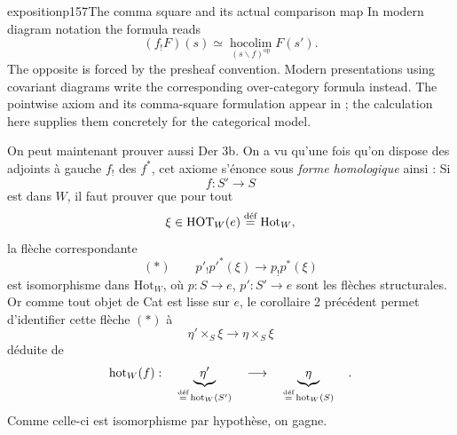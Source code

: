 \begin{dcomment}{exposition}{p157}{The comma square and its actual comparison map}
In modern diagram notation the formula reads
\[
 (f_!F)(s)\simeq
 \operatorname*{hocolim}_{(s\backslash f)^{\mathrm{op}}}F(s').
\]
The opposite is forced by the presheaf convention. Modern presentations using covariant diagrams write the corresponding over-category formula instead. The pointwise axiom and its comma-square formulation appear in \citet[Definition~1.5 and Proposition~1.26]{Groth2013}; the calculation here supplies them concretely for the categorical model.
\end{dcomment}


On peut maintenant prouver aussi Der 3b. On a vu qu'une fois qu'on dispose des adjoints à gauche $f_!$ des $f^*$, cet axiome s'énonce sous \textit{forme homologique} ainsi : Si
\[f : S'\longrightarrow S\]
est dans $W$, il faut prouver que pour tout
\[\xi\in\mathrm{HOT}_W(e)\overset{\text{déf}}{=}\mathrm{Hot}_W,\]
la flèche correspondante
\[(*)\qquad p'_!p'^*(\xi)\longrightarrow p_!p^*(\xi)\]
est isomorphisme dans $\mathrm{Hot}_W$, où $p : S\longrightarrow e$, $p' : S'\longrightarrow e$ sont les flèches structurales. Or comme tout objet de Cat est lisse sur $e$, le corollaire 2 précédent permet d'identifier cette flèche $(*)$ à
\[\eta'\times_S\xi\longrightarrow\eta\times_S\xi\]
déduite de
\[\hot_W(f) :\quad\underbrace{\ \eta'\ }_{\overset{\text{déf}}{=}\,\hot_W(S')}\quad\longrightarrow\quad\underbrace{\ \eta\ }_{\overset{\text{déf}}{=}\,\hot_W(S)}\quad.\]
Comme celle-ci est isomorphisme par hypothèse, on gagne.

